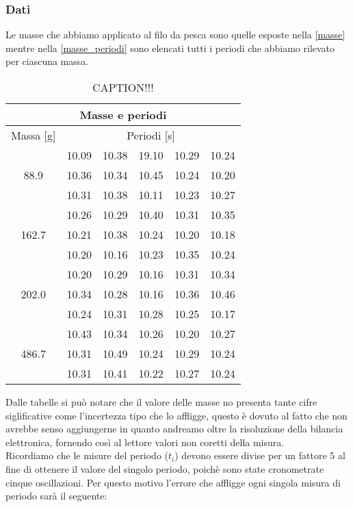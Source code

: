 \subsubsection{Dati}
Le masse che abbiamo applicato al filo da pesca sono quelle esposte nella \ref{masse} mentre nella \ref{masse_periodi} sono elencati tutti i periodi che abbiamo rilevato per ciascuna massa.\\

\begin{table}
    \centering
    \begin{tabular}{c c c c c c}
        \multicolumn{6}{c}{\textbf{Masse e periodi}} \\
        \toprule
        Massa [\si{\gram}] & \multicolumn{5}{c}{Periodi [s]} \\
        \midrule
	\multirow{3}{*}{88.9}	& 10.09	& 10.38	& 19.10	& 10.29	& 10.24	\\
				& 10.36	& 10.34	& 10.45	& 10.24	& 10.20	\\
				& 10.31	& 10.38	& 10.11	& 10.23	& 10.27 \\
	\multirow{3}{*}{162.7}	& 10.26	& 10.29	& 10.40	& 10.31	& 10.35	\\
				& 10.21	& 10.38	& 10.24	& 10.20	& 10.18	\\
				& 10.20	& 10.16	& 10.23	& 10.35	& 10.24 \\
	\multirow{3}{*}{202.0}	& 10.20	& 10.29	& 10.16	& 10.31	& 10.34 \\
				& 10.34	& 10.28	& 10.16	& 10.36	& 10.46 \\
				& 10.24	& 10.31	& 10.28	& 10.25	& 10.17 \\
	\multirow{3}{*}{486.7}	& 10.43	& 10.34	& 10.26	& 10.20	& 10.27 \\
				& 10.31	& 10.49	& 10.24	& 10.29	& 10.24 \\
				& 10.31	& 10.41	& 10.22	& 10.27	& 10.24 \\
        \bottomrule
    \end{tabular}
    \caption{CAPTION!!!}
    \label{tab:masse_periodi}
\end{table}

Dalle tabelle si può notare che il valore delle masse no presenta tante cifre siglificative come l'incertezza tipo che lo affligge, questo è dovuto al fatto che non avrebbe senso aggiungerne in quanto andreamo oltre la risoluzione della bilancia elettronica, fornendo così al lettore valori non coretti della misura.\\

Ricordiamo che le misure del periodo ($t_i$) devono essere divise per un fattore 5 al fine di ottenere il valore del singolo periodo, poichè sono state cronometrate cinque oscillazioni. Per questo motivo l'errore che affligge ogni singola misura di periodo sarà il seguente:

